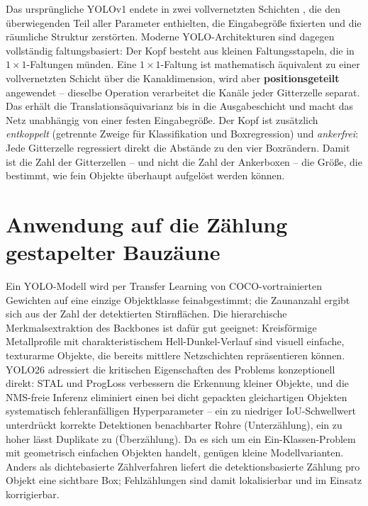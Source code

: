  Das ursprüngliche YOLOv1 endete in zwei vollvernetzten Schichten
\parencite{redmon2016}, die den überwiegenden Teil aller Parameter enthielten,
die Eingabegröße fixierten und die räumliche Struktur zerstörten. Moderne
YOLO-Architekturen sind dagegen vollständig faltungsbasiert: Der Kopf besteht aus
kleinen Faltungsstapeln, die in $1\times1$-Faltungen münden. Eine
$1\times1$-Faltung ist mathematisch äquivalent zu einer vollvernetzten Schicht
über die Kanaldimension, wird aber \textbf{positionsgeteilt} angewendet --
dieselbe Operation verarbeitet die Kanäle jeder Gitterzelle separat. Das erhält
die Translationsäquivarianz bis in die Ausgabeschicht und macht das Netz
unabhängig von einer festen Eingabegröße. Der Kopf ist zusätzlich
\emph{entkoppelt} (getrennte Zweige für Klassifikation und Boxregression) und
\emph{ankerfrei}: Jede Gitterzelle regressiert direkt die Abstände zu den vier
Boxrändern. Damit ist die Zahl der Gitterzellen -- und nicht die Zahl der
Ankerboxen -- die Größe, die bestimmt, wie fein Objekte überhaupt aufgelöst
werden können.

\section{Anwendung auf die Zählung gestapelter Bauzäune}
\label{sec:anwendung}

Ein YOLO-Modell wird per Transfer Learning von COCO-vortrainierten Gewichten
\parencite{yosinski2014} auf eine einzige Objektklasse feinabgestimmt; die
Zaunanzahl ergibt sich aus der Zahl der detektierten Stirnflächen. Die
hierarchische Merkmalsextraktion des Backbones ist dafür gut geeignet:
Kreisförmige Metallprofile mit charakteristischem Hell-Dunkel-Verlauf sind
visuell einfache, texturarme Objekte, die bereits mittlere Netzschichten
repräsentieren können. YOLO26 adressiert die kritischen Eigenschaften des
Problems konzeptionell direkt: STAL und ProgLoss verbessern die Erkennung kleiner
Objekte, und die NMS-freie Inferenz eliminiert einen bei dicht gepackten
gleichartigen Objekten systematisch fehleranfälligen Hyperparameter -- ein zu
niedriger IoU-Schwellwert unterdrückt korrekte Detektionen benachbarter Rohre
(Unterzählung), ein zu hoher lässt Duplikate zu (Überzählung). Da es sich um ein
Ein-Klassen-Problem mit geometrisch einfachen Objekten handelt, genügen kleine
Modellvarianten. Anders als dichtebasierte Zählverfahren
\parencite{lempitsky2010,zhang2016counting} liefert die detektionsbasierte
Zählung pro Objekt eine sichtbare Box; Fehlzählungen sind damit lokalisierbar und
im Einsatz korrigierbar.


